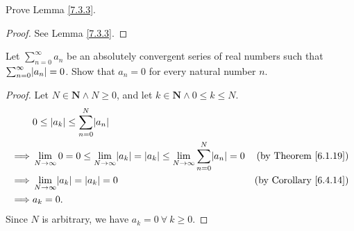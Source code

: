 \begin{exercise}\label{ex 7.3.2}
Prove Lemma \ref{7.3.3}.
\end{exercise}

\begin{proof}
See Lemma \ref{7.3.3}.
\end{proof}

\begin{exercise}\label{ex 7.3.3}
Let \(\sum_{n = 0}^\infty a_n\) be an absolutely convergent series of real numbers such that \(\sum_{n = 0}^\infty \abs*{a_n} = 0\).
Show that \(a_n = 0\) for every natural number \(n\).
\end{exercise}

\begin{proof}
Let \(N \in \mathbf{N} \land N \geq 0\), and let \(k \in \mathbf{N} \land 0 \leq k \leq N\).
\begin{align*}
& 0 \leq \abs*{a_k} \leq \sum_{n = 0}^N \abs*{a_n} \\
\implies & \lim_{N \to \infty} 0 = 0 \leq \lim_{N \to \infty} \abs*{a_k} = \abs*{a_k} \leq \lim_{N \to \infty} \sum_{n = 0}^N \abs*{a_n} = 0 & \text{(by Theorem \ref{6.1.19})} \\
\implies & \lim_{N \to \infty} \abs*{a_k} = \abs*{a_k} = 0 & \text{(by Corollary \ref{6.4.14})} \\
\implies & a_k = 0.
\end{align*}
Since \(N\) is arbitrary, we have \(a_k = 0 \ \forall\ k \geq 0\).
\end{proof}